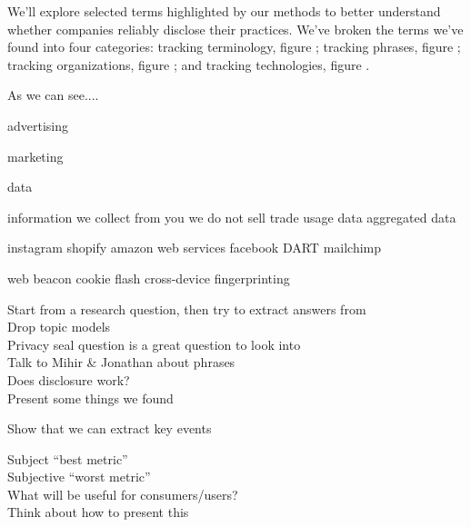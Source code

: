 We'll explore selected terms highlighted by our methods to better understand whether companies reliably disclose their practices. We've broken the terms we've found into four categories: tracking terminology, figure ; tracking phrases, figure ; tracking organizations, figure ; and tracking technologies, figure .

As we can see.... 


advertising

marketing

data


information we collect from you
we do not sell trade
usage data
aggregated data


instagram
shopify
amazon web services
facebook
DART
mailchimp


web beacon
cookie
flash
cross-device
fingerprinting


Start from a research question, then try to extract answers from \\
Drop topic models\\

Privacy seal question is a great question to look into\\
Talk to Mihir \& Jonathan about phrases\\

Does disclosure work?\cite{marotta2019does} \\

Present some things we found

Show that we can extract key events

Subject ``best metric''\\
Subjective ``worst metric''\\
What will be useful for consumers/users?\\

Think about how to present this
